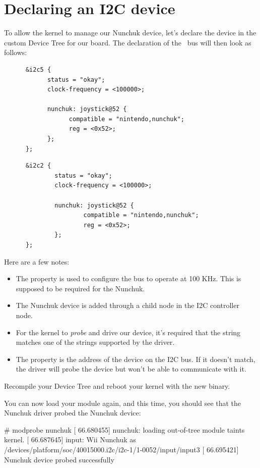 \section{Declaring an I2C device}

To allow the kernel to manage our Nunchuk device, let's declare the
device in the custom Device Tree for our board. The declaration of the \busname\ 
bus will then look as follows:

\if{}
      \begin{verbatim}
      &i2c5 {
            status = "okay";
            clock-frequency = <100000>;

            nunchuk: joystick@52 {
                  compatible = "nintendo,nunchuk";
                  reg = <0x52>;
            };
      };
      \end{verbatim}
\fi
\if{}
      \begin{verbatim}
      &i2c2 {
              status = "okay";
              clock-frequency = <100000>;
      
              nunchuk: joystick@52 {
                      compatible = "nintendo,nunchuk";
                      reg = <0x52>;
              };
      };
      \end{verbatim}
\fi

Here are a few notes:
\begin{itemize}
\item The  property is used to configure the bus
      to operate at 100 KHz. This is supposed to be required for the
      Nunchuk.
\item The Nunchuk device is added through a child node in the I2C
      controller node.
\item For the kernel to {\em probe} and drive our device, it's required
      that the  string matches one of the
      \code{compatible} strings supported by the driver.
\item The  property is the address of the device on the
      I2C bus. If it doesn't match, the driver will probe the device
      but won't be able to communicate with it.
\end{itemize}

Recompile your Device Tree and reboot your kernel with the new binary.

You can now load your module again, and this time, you should see that
the Nunchuk driver probed the Nunchuk device:

\begin{bashinput}
# modprobe nunchuk
[   66.680455] nunchuk: loading out-of-tree module taints kernel.
[   66.687645] input: Wii Nunchuk as /devices/platform/soc/40015000.i2c/i2c-1/1-0052/input/input3
[   66.695421] Nunchuk device probed successfully
\end{bashinput}

